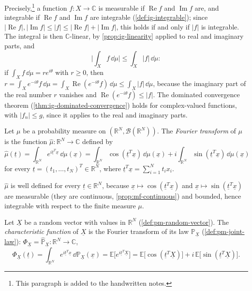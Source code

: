 Precisely,\footnote{This paragraph is added to the handwritten notes.} a function
$f:X\to\mathbb C$ is measurable if $\operatorname{Re}f$ and $\operatorname{Im}f$ are, and
integrable if $\operatorname{Re}f$ and $\operatorname{Im}f$ are integrable
(\cref{def:ig-integrable}); since
$|\operatorname{Re}f|,|\operatorname{Im}f|\le|f|\le|\operatorname{Re}f|+|\operatorname{Im}f|$,
this holds if and only if $|f|$ is integrable. The integral is then $\mathbb C$-linear, by
\cref{prop:ig-linearity} applied to real and imaginary parts, and
\begin{equation}\label{eq:cf-modulus}
  \Big|\int_Xf\,\dd\mu\Big|\le\int_X|f|\,\dd\mu :
\end{equation}
if $\int_Xf\,\dd\mu=re^{i\theta}$ with $r\ge0$, then
$r=\int_Xe^{-i\theta}f\,\dd\mu=\int_X\operatorname{Re}(e^{-i\theta}f)\,\dd\mu\le\int_X|f|\,\dd\mu$,
because the imaginary part of the real number $r$ vanishes and
$\operatorname{Re}(e^{-i\theta}f)\le|f|$. The dominated convergence theorem
(\cref{thm:ig-dominated-convergence}) holds for complex-valued functions, with $|f_n|\le g$,
since it applies to the real and imaginary parts.

\begin{definition}\label{def:cf-fourier}
Let $\mu$ be a probability measure on $(\mathbb R^N,\mathcal B(\mathbb R^N))$. The
\emph{Fourier transform} of $\mu$ is the function $\hat\mu:\mathbb R^N\to\mathbb C$ defined by
\[
  \hat\mu(\underline t)=\int_{\mathbb R^N}e^{i\underline t^T\underline x}\,\dd\mu(\underline x)
  =\int_{\mathbb R^N}\cos(\underline t^T\underline x)\,\dd\mu(\underline x)
  +i\int_{\mathbb R^N}\sin(\underline t^T\underline x)\,\dd\mu(\underline x)
\]
for every $\underline t=(t_1,\dots,t_N)^T\in\mathbb R^N$, where
$\underline t^T\underline x=\sum_{i=1}^Nt_ix_i$.
\end{definition}

\begin{remark}\label{rem:cf-well-defined}
$\hat\mu$ is well defined for every $\underline t\in\mathbb R^N$, because
$\underline x\mapsto\cos(\underline t^T\underline x)$ and
$\underline x\mapsto\sin(\underline t^T\underline x)$ are measurable (they are continuous,
\cref{prop:mf-continuous}) and bounded, hence integrable with respect to the finite measure
$\mu$.
\end{remark}

\begin{definition}\label{def:cf-characteristic}
Let $\underline X$ be a random vector with values in $\mathbb R^N$ (\cref{def:pm-random-vector}).
The \emph{characteristic function} of $\underline X$ is the Fourier transform of its law
$\mathbb P_{\underline X}$ (\cref{def:pm-joint-law}):
$\Phi_{\underline X}=\hat{\mathbb P}_{\underline X}:\mathbb R^N\to\mathbb C$,
\[
  \Phi_{\underline X}(\underline t)
  =\int_{\mathbb R^N}e^{i\underline t^T\underline x}\,\dd\mathbb P_{\underline X}(\underline x)
  =\mathbb E\big[e^{i\underline t^T\underline X}\big]
  =\mathbb E\big[\cos(\underline t^T\underline X)\big]+i\,\mathbb E\big[\sin(\underline t^T\underline X)\big].
\]
\end{definition}

